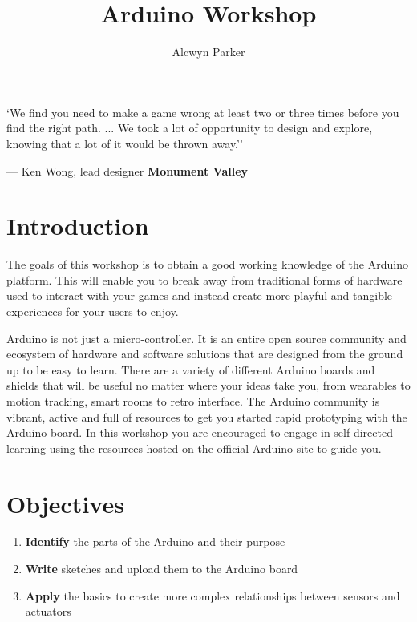 \documentclass{../../fal_assignment}
\title{Arduino Workshop}
\author{Alcwyn Parker} %
\begin{document}
\maketitle

\begin{marginquote}
`We find you need to make a game wrong at least two or three times before you find the right path. ...
We took a lot of opportunity to design and explore, knowing that a lot of it would be thrown away.''
\par --- Ken Wong, lead designer \textbf{Monument Valley}
\end{marginquote}


\section*{Introduction}
The goals of this workshop is to obtain a good working knowledge of the Arduino platform. This will enable you to break away from traditional forms of hardware used to interact with your games and instead create more playful and tangible experiences for your users to enjoy.

Arduino is not just a micro-controller. It is an entire open source community and ecosystem of hardware and software solutions that are designed from the ground up to be easy to learn. There are a variety of different Arduino boards and shields that will be useful no matter where your ideas take you, from wearables to motion tracking, smart rooms to retro interface. The Arduino community is vibrant, active and full of resources to get you started rapid prototyping with the Arduino board. In this workshop you are encouraged to engage in self directed learning using the resources hosted on the official Arduino site to guide you. 

\section*{Objectives}
\begin{enumerate}[label=(\Alph*)]
	\item \textbf{Identify} the parts of the Arduino and their purpose 
	\item \textbf{Write} sketches and upload them to the Arduino board
	\item \textbf{Apply} the basics to create more complex relationships between sensors and actuators
\end{enumerate}
\end{document}
